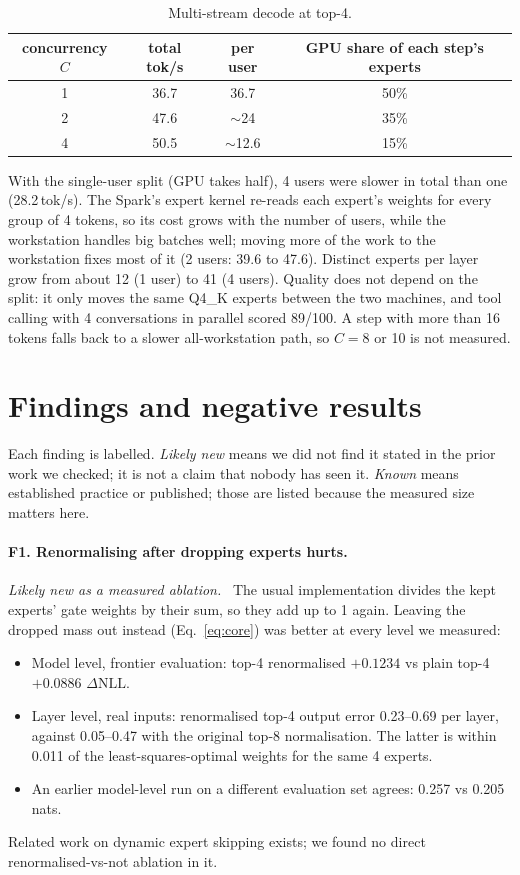 \documentclass[11pt]{article}
\newcommand{\tps}{\,tok/s}
\newcommand{\dNLL}{\Delta\mathrm{NLL}}
\newcommand{\finding}[2]{\paragraph{#1}\emph{#2}\ }
\begin{document}
\begin{table}[h]
\centering\small
\caption{Multi-stream decode at top-4.}
\label{tab:multi}
\begin{tabular}{cccc}
\toprule
concurrency $C$ & total tok/s & per user & GPU share of each step's experts \\
\midrule
1 & 36.7 & 36.7 & 50\% \\
2 & 47.6 & $\sim$24 & 35\% \\
4 & 50.5 & $\sim$12.6 & 15\% \\
\bottomrule
\end{tabular}
\end{table}

With the single-user split (GPU takes half), 4 users were slower in total than one (28.2\tps). The Spark's expert kernel
re-reads each expert's weights for every group of 4 tokens, so its cost grows with the number of users, while the
workstation handles big batches well; moving more of the work to the workstation fixes most of it (2 users: 39.6 to
47.6). Distinct experts per layer grow from about 12 (1 user) to 41 (4 users). Quality does not depend on the split: it
only moves the same Q4\_K experts between the two machines, and tool calling with 4 conversations in parallel scored
89/100. A step with more than 16 tokens falls back to a slower all-workstation path, so $C = 8$ or 10 is not measured.

\section{Findings and negative results}
\label{sec:findings}
Each finding is labelled. \emph{Likely new} means we did not find it stated in the prior work we checked; it is not a
claim that nobody has seen it. \emph{Known} means established practice or published; those are listed because the
measured size matters here.

\finding{F1. Renormalising after dropping experts hurts.}{Likely new as a measured ablation.}
The usual implementation divides the kept experts' gate weights by their sum, so they add up to 1 again. Leaving the
dropped mass out instead (Eq.~\eqref{eq:core}) was better at every level we measured:
\begin{itemize}
  \item Model level, frontier evaluation: top-4 renormalised $+0.1234$ vs plain top-4 $+0.0886$ $\dNLL$.
  \item Layer level, real inputs: renormalised top-4 output error 0.23--0.69 per layer, against 0.05--0.47 with the
    original top-8 normalisation. The latter is within 0.011 of the least-squares-optimal weights for the same 4 experts.
  \item An earlier model-level run on a different evaluation set agrees: 0.257 vs 0.205 nats.
\end{itemize}
Related work on dynamic expert skipping exists; we found no direct renormalised-vs-not ablation in it.
\end{document}
